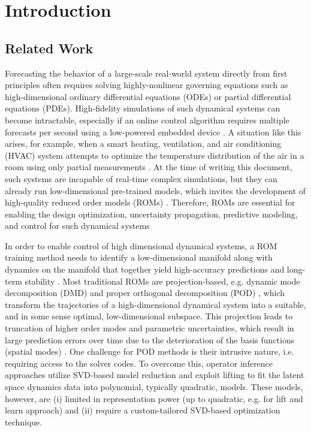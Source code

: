 
\section{Introduction}
\subsection{Related Work}
        Forecasting the behavior of a large-scale real-world system directly from first principles often requires solving highly-nonlinear governing equations such as high-dimensional ordinary differential equations (ODEs) or partial differential equations (PDEs). 
        High-fidelity simulations of such dynamical systems can become intractable, especially if an online control algorithm requires multiple forecasts per second using a low-powered embedded device \cite{rowley2017model,lucia2004reduced,benner2015survey}. A situation like this arises, for example, when a smart heating, ventilation, and air conditioning (HVAC) system attempts to optimize the temperature distribution of the air in a room using only partial measurements \cite{farahmand2016learning,nabi2022robust}. At the time of writing this document, such systems are incapable of real-time complex simulations, but they can already run low-dimensional pre-trained models, which invites the development of high-quality reduced order models (ROMs) \cite{otterness2017evaluation}. Therefore, ROMs are essential for enabling the design optimization, uncertainty propagation, predictive modeling, and control for such dynamical systems \cite{brunton2022data,kutz2016dynamic,rowley2017model,jones2020characterising}
        
        In order to enable control of high dimensional dynamical systems, a ROM training method needs to  identify a low-dimensional manifold along with dynamics on the manifold that together yield high-accuracy predictions and long-term stability \cite{ahmed2021closures,noack2011reduced}. Most traditional ROMs are projection-based, e.g. dynamic mode decomposition (DMD) \cite{kutz2016dynamic,tu2013dynamic} and proper orthogonal decomposition (POD) \cite{holmes2012turbulence}, which transform the trajectories of a high-dimensional dynamical system into a suitable, and in some sense optimal, low-dimensional subspace. This projection leads to truncation of higher order modes and parametric uncertainties, which result in large prediction errors over time due to the deterioration of the basis functions (spatial modes) \cite{benner2015survey}. One challenge for POD methods is their intrusive nature, i.e. requiring access to the solver codes. To overcome this, operator inference approaches \cite{qian2020lift,peherstorfer2016data} utilize SVD-based model reduction and  exploit lifting to fit the latent space dynamics data into polynomial, typically quadratic, models. These models, however, are (i) limited in representation power (up to quadratic, e.g. for lift and learn approach) and (ii) require a custom-tailored SVD-based optimization technique. 
        

